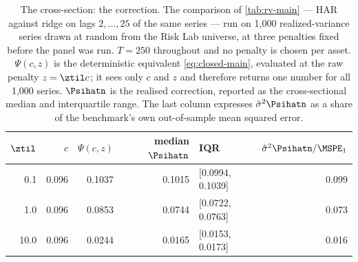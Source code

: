 \begin{table}[htbp]
\centering
\caption{The cross-section: the correction. The comparison of \cref{tab:rv-main} --- \citet{corsi2009simple} HAR against ridge on lags $2,\dots,25$ of the same series --- run on 1{,}000 realized-variance series drawn at random from the Risk Lab universe, at three penalties fixed before the panel was run. $T=250$ throughout and no penalty is chosen per asset. $\Psi(c,z)$ is the deterministic equivalent \eqref{eq:closed-main}, evaluated at the raw penalty $z=\ztil c$; it sees only $c$ and $z$ and therefore returns one number for all 1{,}000 series. $\Psihatn$ is the realised correction, reported as the cross-sectional median and interquartile range. The last column expresses $\hat\sigma^2\Psihatn$ as a share of the benchmark's own out-of-sample mean squared error.}
\label{tab:rv-cross-psi}
\small
\begin{tabular}{rrrrlr}
\toprule
$\ztil$ & $c$ & $\Psi(c,z)$ & median $\Psihatn$ & IQR & $\hat\sigma^2\Psihatn/\MSPE_1$ \\
\midrule
0.1 & 0.096 & 0.1037 & 0.1015 & [0.0994, 0.1039] & 0.099 \\
1.0 & 0.096 & 0.0853 & 0.0744 & [0.0722, 0.0763] & 0.073 \\
10.0 & 0.096 & 0.0244 & 0.0165 & [0.0153, 0.0173] & 0.016 \\
\bottomrule
\end{tabular}
\end{table}
